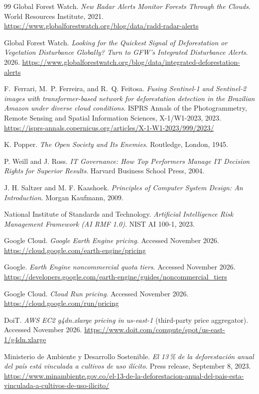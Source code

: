 \documentclass{article}
\begin{document}
\begin{thebibliography}{99}
Global Forest Watch. \textit{New Radar Alerts Monitor Forests Through the
Clouds}. World Resources Institute, 2021.
\url{https://www.globalforestwatch.org/blog/data/radd-radar-alerts}

Global Forest Watch. \textit{Looking for the Quickest Signal of Deforestation
or Vegetation Disturbance Globally? Turn to GFW's Integrated Disturbance
Alerts}. 2026.
\url{https://www.globalforestwatch.org/blog/data/integrated-deforestation-alerts}

F.~Ferrari, M.~P. Ferreira, and R.~Q. Feitosa. \textit{Fusing Sentinel-1 and
Sentinel-2 images with transformer-based network for deforestation detection
in the Brazilian Amazon under diverse cloud conditions}. ISPRS Annals of the
Photogrammetry, Remote Sensing and Spatial Information Sciences,
X-1/W1-2023, 2023.
\url{https://isprs-annals.copernicus.org/articles/X-1-W1-2023/999/2023/}


K. Popper. \textit{The Open Society and Its Enemies}. Routledge, London, 1945.

P. Weill and J. Ross. \textit{IT Governance: How Top Performers Manage IT
Decision Rights for Superior Results}. Harvard Business School Press, 2004.

J. H. Saltzer and M. F. Kaashoek. \textit{Principles of Computer System Design:
An Introduction}. Morgan Kaufmann, 2009.

National Institute of Standards and Technology. \textit{Artificial Intelligence
Risk Management Framework (AI RMF 1.0)}. NIST AI 100-1, 2023.

Google Cloud. \textit{Google Earth Engine pricing}. Accessed November 2026.
\url{https://cloud.google.com/earth-engine/pricing}

Google. \textit{Earth Engine noncommercial quota tiers}. Accessed November 2026.
\url{https://developers.google.com/earth-engine/guides/noncommercial_tiers}

Google Cloud. \textit{Cloud Run pricing}. Accessed November 2026.
\url{https://cloud.google.com/run/pricing}

DoiT. \textit{AWS EC2 g4dn.xlarge pricing in us-east-1} (third-party price
aggregator). Accessed November 2026.
\url{https://www.doit.com/compute/spot/us-east-1/g4dn.xlarge}

Ministerio de Ambiente y Desarrollo Sostenible. \textit{El 13\,\% de la deforestaci\'on anual del pa\'is est\'a vinculada a cultivos de uso il\'icito}. Press release, September 8, 2023.
\url{https://www.minambiente.gov.co/el-13-de-la-deforestacion-anual-del-pais-esta-vinculada-a-cultivos-de-uso-ilicito/}


\end{thebibliography}
\end{document}
